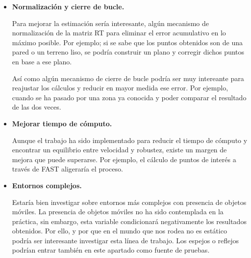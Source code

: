\begin{itemize}
\item \textbf{Normalización y cierre de bucle.}

Para mejorar la estimación sería interesante, algún mecanismo de normalización de la matriz RT para eliminar el error acumulativo en lo máximo posible. Por ejemplo; si se sabe que los puntos obtenidos son de una pared o un terreno liso, se podría construir un plano y corregir dichos puntos en base a ese plano.

Así como algún mecanismo de cierre de bucle podría ser muy intereante para reajustar los cálculos y reducir en mayor medida ese error. Por ejemplo, cuando se ha pasado por una zona ya conocida y poder comparar el resultado de las dos veces.

\item \textbf{Mejorar tiempo de cómputo.}

Aunque el trabajo ha sido implementado para reducir el tiempo de cómputo y encontrar un equilibrio entre velocidad y robustez, existe un margen de mejora que puede superarse. Por ejemplo, el cálculo de puntos de interés a través de FAST aligeraría el proceso.

\item \textbf{Entornos complejos.}

Estaría bien investigar sobre entornos más complejos con presencia de objetos móviles. La presencia de objetos móviles no ha sido contemplada en la práctica, sin embargo, esta variable condicionará negativamente los resultados obtenidos. Por ello, y por que en el mundo que nos rodea no es estático podría ser interesante investigar esta línea de trabajo. Los espejos o reflejos podrían entrar también en este apartado como fuente de pruebas.
\end{itemize}